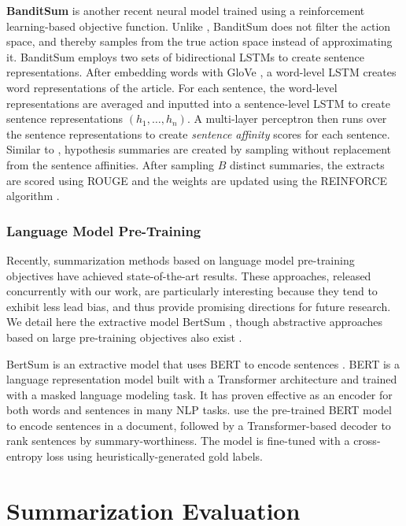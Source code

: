 \textbf{BanditSum} is another recent neural model trained using a reinforcement learning-based objective function. Unlike \cite{DBLP:Narayan/2018}, BanditSum does not filter the action space, and thereby samples from the true action space instead of approximating it. BanditSum employs two sets of bidirectional LSTMs to create sentence representations. After embedding words with GloVe \parencite{we2_pennington2014glove}, a word-level LSTM creates word representations of the article. For each sentence, the word-level representations are averaged and inputted into a sentence-level LSTM to create sentence representations $(h_1,\dots,h_n)$. A multi-layer perceptron then runs over the sentence representations to create \textit{sentence affinity} scores for each sentence. Similar to \cite{DBLP:Narayan/2018}, hypothesis summaries are created by sampling without replacement from the sentence affinities. After sampling $B$ distinct summaries, the extracts are scored using ROUGE and the weights are updated using the REINFORCE algorithm \parencite{williams1992simple}.

\subsubsection{Language Model Pre-Training}
Recently, summarization methods based on language model pre-training objectives have achieved state-of-the-art results. These approaches, released concurrently with our work, are particularly interesting because they tend to exhibit less lead bias, and thus provide promising directions for future research. We detail here the extractive model BertSum \parencite{bertsum}, though abstractive approaches based on large pre-training objectives also exist \parencite{lewis2019bart}.

BertSum is an extractive model that uses BERT to encode sentences \parencite{bertsum}. BERT is a language representation model built with a Transformer architecture \parencite{vaswani2017attentionTransformer} and trained with a masked language modeling task. It has proven effective as an encoder for both words and sentences in many NLP tasks. \cite{bertsum} use the pre-trained BERT model to encode sentences in a document, followed by a Transformer-based decoder to rank sentences by summary-worthiness. The model is fine-tuned with a cross-entropy loss using heuristically-generated gold labels.

\section{Summarization Evaluation}
